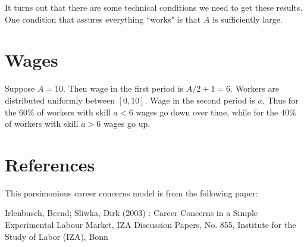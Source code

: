 \documentclass{article}
\begin{document}
It turns out that there are some technical conditions we need to get these results. One condition that assures everything ``works" is that $A$ is sufficiently large.

  \section{Wages}

  Suppose $A=10$. Then wage in the first period is $A/2+1=6$. Workers are distributed uniformly between $[0,10]$. Wage in the second period is $a$. Thus for the 60\% of workers with skill $a<6$ wages go down over time, while for the 40\% of workers with skill $a>6$ wages go up.


\section{References}

This parsimonious career concerns model is from the following paper:

 Irlenbusch, Bernd; Sliwka, Dirk (2003) : Career Concerns in a Simple
Experimental Labour Market, IZA Discussion Papers, No. 855, Institute for the Study of Labor
(IZA), Bonn
\end{document}
